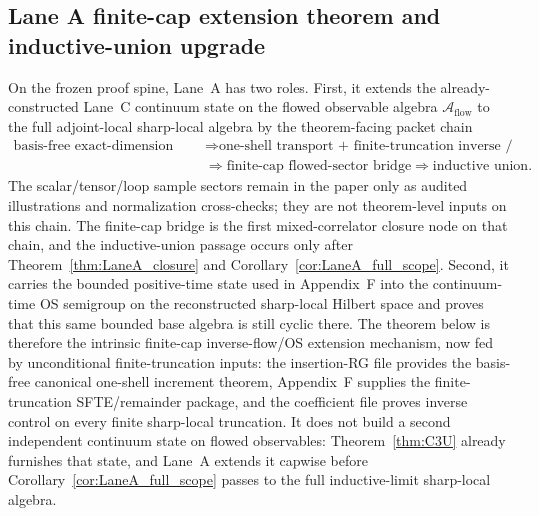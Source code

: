 \subsection{Lane A finite-cap extension theorem and inductive-union upgrade}
On the frozen proof spine, Lane~A has two roles.
First, it extends the already-constructed Lane~C continuum state on the flowed observable algebra $\mathcal A_{\mathrm{flow}}$ to the full adjoint-local sharp-local algebra by the theorem-facing packet chain
\[
\begin{aligned}
\text{basis-free exact-dimension quotient blocks}
&\Longrightarrow \text{one-shell transport + finite-truncation inverse / SFTE package}\\
&\Longrightarrow \text{finite-cap flowed-sector bridge}
\Longrightarrow \text{inductive union}.
\end{aligned}
\]
The scalar/tensor/loop sample sectors remain in the paper only as audited illustrations and normalization cross-checks; they are not theorem-level inputs on this chain.
The finite-cap bridge is the first mixed-correlator closure node on that chain, and the inductive-union passage occurs only after Theorem~\ref{thm:LaneA_closure} and Corollary~\ref{cor:LaneA_full_scope}.
Second, it carries the bounded positive-time state used in Appendix~F into the continuum-time OS semigroup on the reconstructed sharp-local Hilbert space and proves that this same bounded base algebra is still cyclic there.
The theorem below is therefore the intrinsic finite-cap inverse-flow/OS extension mechanism, now fed by unconditional finite-truncation inputs: the insertion-RG file provides the basis-free canonical one-shell increment theorem, Appendix~F supplies the finite-truncation SFTE/remainder package, and the coefficient file proves inverse control on every finite sharp-local truncation.
It does not build a second independent continuum state on flowed observables: Theorem~\ref{thm:C3U} already furnishes that state, and Lane~A extends it capwise before Corollary~\ref{cor:LaneA_full_scope} passes to the full inductive-limit sharp-local algebra.



